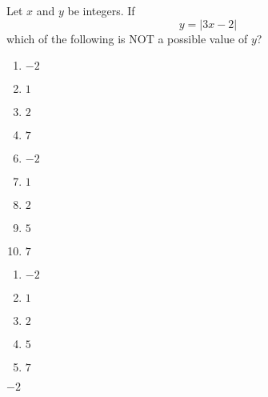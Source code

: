








 Let $x$ and $y$ be integers.  If \[y = |3x-2|\]which of the following is NOT a possible value of $y$?



\ifsat
	\begin{enumerate}[label=\Alph*)]
		\item   $-2$ %
		\item  $1$
		\item  $2$
		\item  $7$
	\end{enumerate}
\else
\fi

\ifacteven
	\begin{enumerate}[label=\textbf{\Alph*.},itemsep=\fill,align=left]
		\setcounter{enumii}{5}
		\item   $-2$ %
		\item  $1$
		\item  $2$
		\addtocounter{enumii}{1}
		\item  $5$
		\item  $7$
	\end{enumerate}
\else
\fi

\ifactodd
	\begin{enumerate}[label=\textbf{\Alph*.},itemsep=\fill,align=left]
		\item   $-2$ %
		\item  $1$
		\item  $2$
		\item  $5$
		\item  $7$
	\end{enumerate}
\else
\fi

\ifgridin
   $-2$ %
		
\else
\fi

